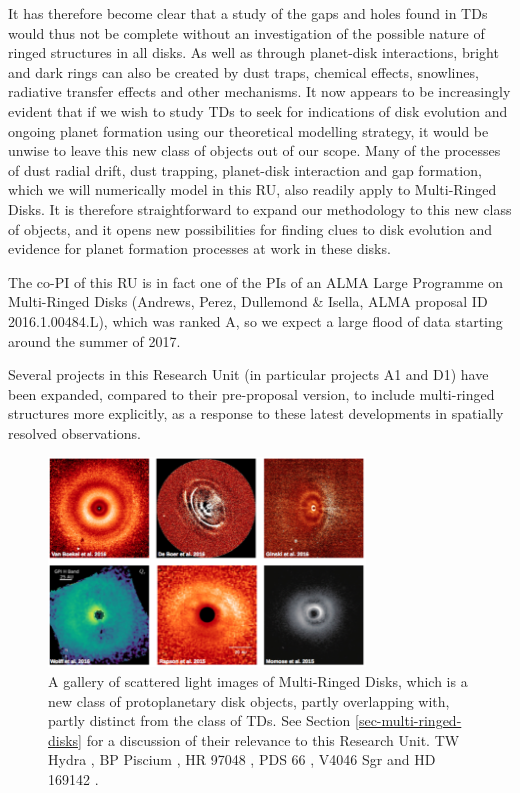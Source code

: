 \documentclass[10pt,fleqn,twoside]{article}
\begin{document}
It has therefore become clear that a study of the gaps and holes found in
TDs would thus not be complete without an investigation of the
possible nature of ringed structures in all disks. As well as through planet-disk
interactions, bright and dark rings can also be created by dust traps,
chemical effects, snowlines, radiative transfer effects and other
mechanisms. It now appears to be increasingly evident that if we wish to
study TDs to seek for indications of disk evolution and ongoing planet
formation using our theoretical modelling strategy, it would be unwise
to leave this new class of objects out of our scope. Many of the processes of
dust radial drift, dust trapping, planet-disk interaction and gap formation,
which we will numerically model in this RU, 
also readily apply to Multi-Ringed Disks. It is therefore straightforward to expand
our methodology to this new class of objects, and it opens new
possibilities for finding clues to disk evolution and evidence for planet
formation processes at work in these disks.

The co-PI of this RU is in fact one of the PIs of an ALMA Large Programme on
Multi-Ringed Disks (Andrews, Perez, Dullemond \& Isella, ALMA proposal ID
2016.1.00484.L), which was ranked A, so we expect a large flood of data
starting around the summer of 2017. 

Several projects in this Research Unit (in particular projects A1 and D1)
have been expanded, compared to their pre-proposal version, to include
multi-ringed structures more explicitly, as a response to these latest
developments in spatially resolved observations.

\begin{figure}
\centerline{\includegraphics[width=0.75\textwidth]{figures/Ringed_Scat.png}}
\caption{\label{fig-ringed-scat} A gallery of scattered light images of
  Multi-Ringed Disks, which is a new class of protoplanetary disk objects,
  partly overlapping with, partly distinct from the class of TDs. See
  Section \ref{sec-multi-ringed-disks} for a discussion of their relevance
  to this Research Unit. 
  TW Hydra \citep{2016arXiv161008939V}, BP Piscium
  \citep{2017MNRAS.466L...7D}, HR 97048 \citep{2016A&A...595A.112G}, PDS 66
  \citep{2016ApJ...818L..15W}, V4046 Sgr \citep{2015ApJ...803L..10R} and HD
  169142 \citep{2015PASJ...67...83M}.}
\end{figure}
\end{document}
